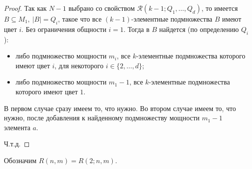 \begin{proof}
    Так как $N - 1$ выбрано со свойством $\mathcal{R}(k-1;Q_1,\ldots,Q_d)$, то имеется $B \subseteq M_1,~|B| = Q_i$, такое что все $(k - 1)$-элементные подмножества $B$ имеют цвет $i$. Без ограничения общности $i = 1$. Тогда в $B$ найдется (по определению $Q_i$):
    \begin{itemize}
        \item либо подмножество мощности $m_i$, все $k$-элементные подмножества которого имеют цвет $i$, для некоторого $i \in \{2,\ldots,d\}$;
        \item либо подмножество мощности $m_1 - 1$, все $k$-элементные подмножества которого имеют цвет $1$.
    \end{itemize}
    
    В первом случае сразу имеем то, что нужно. Во втором случае имеем то, что нужно, после добавления к найденному подмножеству мощности $m_1 - 1$ элемента $a$.

    Ч.т.д.
\end{proof}

\begin{notice}
    Обозначим $R(n, m) = R(2;n,m)$.
\end{notice}